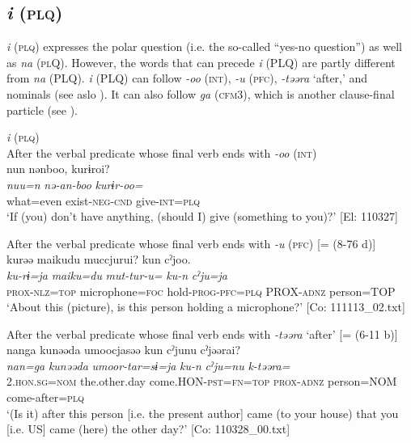 \subsection{\textit{i} (\textsc{plq})}\label{sec:10.3.3}

\textit{i} (\textsc{plq}) expresses the polar question (i.e. the so-called “yes-no question”) as well as \textit{na} (\textsc{pl}Q). However, the words that can precede \textit{i} (PLQ) are partly different from \textit{na} (PLQ). \textit{i} (PLQ) can follow \textit{{}-oo} (\textsc{int}), \textit{{}-u} (\textsc{pfc}), \textit{{}-təəra} ‘after,’ and nominals (see aslo ). It can also follow \textit{ga} (\textsc{cfm}3), which is another clause-final particle (see ).

\ea\label{ex:10.45}   \textit{i} (\textsc{plq})\\
  \ea After the verbal predicate whose final verb ends with \textit{-oo} (\textsc{int})\\
      \glll    nun  nənboo,  kurɨroi?\\
    \textit{nuu=n}  \textit{nə-an-boo}  \textit{kurɨr-oo=}\\
    what=even  exist-\textsc{neg}-\textsc{cnd}  give-\textsc{int}=\textsc{plq}\\
    \glt     ‘If (you) don’t have anything, (should I) give (something to you)?’ [El: 110327]

  \ex After the verbal predicate whose final verb ends with \textit{-u} (\textsc{pfc}) [= (8-76 d)]\\
      \glll    kurəə  {\textbar}maiku{\textbar}du  muccjurui? kun  cˀjoo.\\                                                               
    \textit{ku-rɨ=ja}  \textit{maiku=du}  \textit{mut-tur-u=}  \textit{ku-n}  \textit{cˀju=ja}\\                                                               
    \textsc{prox}-\textsc{nlz}=\textsc{top}  microphone=\textsc{foc}  hold-\textsc{prog}-\textsc{pfc}=\textsc{plq}  PROX-\textsc{adnz}  person=TOP \\
    \glt ‘About this (picture), is this person holding a microphone?’ [Co: 111113\_02.txt]

  \ex After the verbal predicate whose final verb ends with \textit{{}-təəra} ‘after’ [= (6-11 b)]\\
      \glll    nanga  kunəəda  umoocjasəə  kun   cˀjunu  cˀjəərai?\\
    \textit{nan=ga}  \textit{kunəəda}  \textit{umoor-tar=sɨ=ja}  \textit{ku-n}  \textit{cˀju=nu}  \textit{k-təəra=}\\
    2.\textsc{hon}.\textsc{sg}=\textsc{nom}  the.other.day  come.HON-\textsc{pst}=\textsc{fn}=\textsc{top}  \textsc{prox}-\textsc{adnz}   person=NOM  come-after=\textsc{plq}\\
\glt     ‘(Is it) after this person [i.e. the present author] came (to your house) that you [i.e. US] came (here) the other day?’  [Co: 110328\_00.txt]

